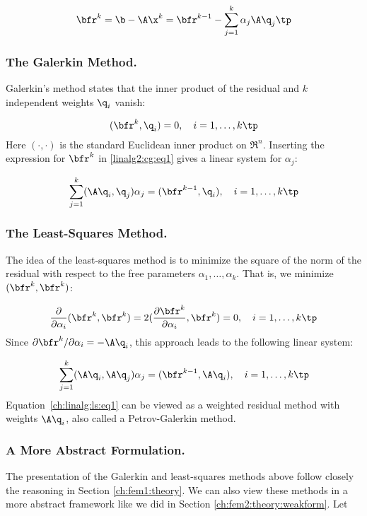 \[ \bfr^k = \b -\A\x^k = \bfr^{k-1} -\sum_{j=1}^k\alpha_j\A\q_j \tp \]

\subsubsection{The Galerkin Method.}
Galerkin's method states that the inner product of the residual and
$k$ independent weights $\q_i$ vanish:

\begin{equation}
(\bfr^k,\q_i )=0,\quad i=1,\ldots,k\tp
\label{linalg2:cg:eq1}
\end{equation}
Here $(\cdot,\cdot )$ is the standard Euclidean inner product on $\Re^n$.
Inserting the expression for $\bfr^k$ in \eqref{linalg2:cg:eq1}
gives a linear system
for $\alpha_j$:

\begin{equation}
\sum_{j=1}^k (\A\q_i,\q_j )\alpha_j = (\bfr^{k-1},\q_i),\quad i=1,\ldots,k
\tp
\end{equation}

\subsubsection{The Least-Squares Method.}
The idea of the least-squares method is to
minimize the square of the norm of the
residual with respect to the free parameters $\alpha_1,\ldots,\alpha_k$.
That is, we minimize $(\bfr^k,\bfr^k)$:

\[ {\partial\over\partial\alpha_i} (\bfr^k,\bfr^k) = 2({\partial\bfr^k\over
\partial\alpha_i},\bfr^k) =0,\quad i=1,\ldots,k\tp \]
Since ${\partial\bfr^k /\partial\alpha_i} = -\A\q_i$, this approach leads to
the following linear system:

\begin{equation}
\sum_{j=1}^k (\A\q_i,\A\q_j)\alpha_j = (\bfr^{k-1},\A\q_i),\quad i=1,\ldots,k\tp
\label{ch:linalg:ls:eq1}
\end{equation}
Equation~\eqref{ch:linalg:ls:eq1}
can  be viewed as a weighted residual method with weights
$\A\q_i$, also called a Petrov-Galerkin method.


\subsubsection{A More Abstract Formulation.}
The presentation of the Galerkin and least-squares methods above follow
closely the reasoning in Section \ref{ch:fem1:theory}. We can also view
these methods in a more abstract framework like we did in
Section \ref{ch:fem2:theory:weakform}.
Let

